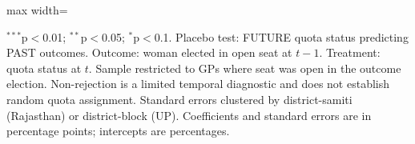 \begin{adjustbox}{max width=\linewidth}
\begin{threeparttable}[b]
      \begin{tablenotes}
         \item $^{***}$p$<$0.01; $^{**}$p$<$0.05; $^{*}$p$<$0.1. Placebo test: FUTURE quota status predicting PAST outcomes. Outcome: woman elected in open seat at $t-1$. Treatment: quota status at $t$. Sample restricted to GPs where seat was open in the outcome election. Non-rejection is a limited temporal diagnostic and does not establish random quota assignment. Standard errors clustered by district-samiti (Rajasthan) or district-block (UP). Coefficients and standard errors are in percentage points; intercepts are percentages.
      \end{tablenotes}
   \end{threeparttable}
\end{adjustbox}
\par\endgroup


